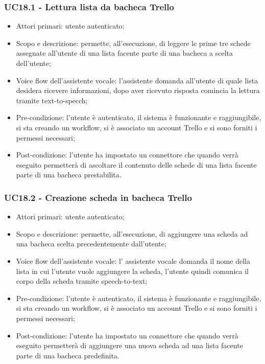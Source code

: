 \subsubsection{UC18.1 - Lettura lista da bacheca Trello}
\begin{itemize}
	\item  Attori primari: utente autenticato;
	\item  Scopo e descrizione: permette, all'esecuzione, di leggere le prime tre schede assegnate all'utente di una lista facente parte di una bacheca a scelta dell'utente;
	\item  Voice flow dell'assistente vocale: l'assistente domanda all'utente di quale lista desidera ricevere informazioni, dopo aver ricevuto risposta comincia la lettura tramite text-to-specch;
	\item  Pre-condizione: l'utente è autenticato, il sistema è funzionante e raggiungibile, si sta creando un workflow, si è associato un account Trello e si sono forniti i permessi necessari;
	\item  Post-condizione: l'utente ha impostato un connettore che quando verrà eseguito permetterà di ascoltare il contenuto delle schede di una lista facente parte di una bacheca prestabilita.
\end{itemize}
\subsubsection{UC18.2 - Creazione scheda in bacheca Trello}
\begin{itemize}
	\item  Attori primari: utente autenticato;
	\item  Scopo e descrizione: permette, all'esecuzione, di aggiungere una scheda ad una bacheca scelta precedentemente dall'utente;
	\item  Voice flow dell'assistente vocale: l' assistente vocale domanda il nome della lista in cui l'utente vuole aggiungere la scheda, l'utente quindi comunica il corpo della scheda tramite speech-to-text;
	\item  Pre-condizione: l'utente è autenticato, il sistema è funzionante e raggiungibile, si sta creando un workflow, si è associato un account Trello e si sono forniti i permessi necessari;
	\item  Post-condizione: l'utente ha impostato un connettore che quando verrà eseguito permetterà di aggiungere una nuova scheda ad una lista facente parte di una bacheca predefinita.
\end{itemize}
